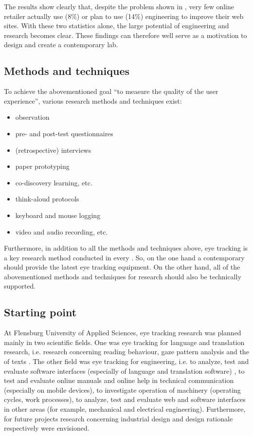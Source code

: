 \documentclass[output=paper]{langsci/langscibook}
\begin{document}
The results show clearly that, despite the problem shown in , very few online retailer actually use (8\%) or plan to use (14\%)  engineering to improve their web sites. With these two statistics alone, the large potential of  engineering and research becomes clear. These findings can therefore well serve as a motivation to design and create a contemporary  lab.

\subsection{Methods and techniques}

To achieve the abovementioned goal ``to measure the quality of the user experience'', various research methods and techniques exist:

\newpage 
\begin{itemize}
\item observation
\item pre- and post-test questionnaires 
\item (retrospective) interviews 
\item paper prototyping 
\item co-discovery learning, etc.
\item think-aloud protocols 
\item keyboard and mouse logging 
\item video and audio recording, etc. 
\end{itemize}

Furthermore, in addition to all the methods and techniques above, eye tracking is a key research method conducted in every . So, on the one hand a contemporary  should provide the latest eye tracking equipment. On the other hand, all of the abovementioned methods and techniques for  research should also be technically supported.

\subsection{Starting point}

At Flensburg University of Applied Sciences, eye tracking research was planned mainly in two scientific fields. One was eye tracking for language and translation research, i.e. research concerning reading behaviour, gaze pattern analysis and the  of texts \citep{Hennig2007}. The other field was eye tracking for  engineering, i.e. to analyze, test and evaluate software interfaces (especially of language and translation software) \citep{HansenSchirra2013}, to test and evaluate online manuals and online help in technical communication (especially on mobile devices), to investigate operation of machinery (operating cycles, work processes), to analyze, test and evaluate web and software interfaces in other areas (for example, mechanical and electrical engineering). Furthermore, for future projects research concerning industrial design and design rationale respectively were envisioned.
\end{document}
